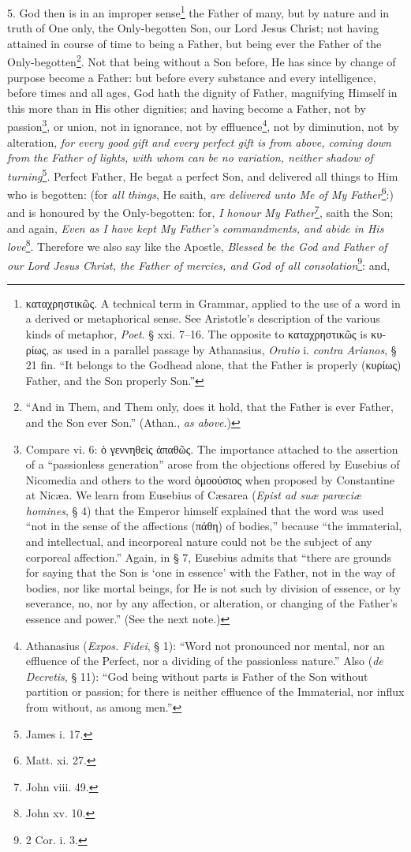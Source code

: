 5. God then is in an improper sense\footnote{\textgreek{καταχρηστικῶς}. A technical term in Grammar, applied to the use of a word in a derived or metaphorical sense. See Aristotle’s description of the various kinds of metaphor, \emph{Poet}. § xxi. 7–16. The opposite to \textgreek{καταχρηστικῶς} is \textgreek{κυρίως}, as used in a parallel passage by Athanasius, \emph{Oratio} i. \emph{contra Arianos}, § 21 fin. “It belongs to the Godhead alone, that the Father is properly (\textgreek{κυρίως}) Father, and the Son properly Son.”} the Father of many, but by nature and in truth of One only, the Only-begotten Son, our Lord Jesus Christ; not having attained in course of time to being a Father, but being ever the Father of the Only-begotten\footnote{“And in Them, and Them only, does it hold, that the Father is ever Father, and the Son ever Son.” (Athan., \emph{as above}.)}. Not that being without a Son before, He has since by change of purpose become a Father: but before every substance and every intelligence, before times and all ages, God hath the dignity of Father, magnifying Himself in this more than in His other dignities; and having become a Father, not by passion\footnote{Compare vi. 6: \textgreek{ὁ γεννηθεὶς ἀπαθῶς.} The importance attached to the assertion of a “passionless generation” arose from the objections offered by Eusebius of Nicomedia and others to the word \textgreek{ὁμοούσιος} when proposed by Constantine at Nicæa. We learn from Eusebius of Cæsarea (\emph{Epist ad suæ parœciæ homines}, § 4) that the Emperor himself explained that the word was used “not in the sense of the affections (\textgreek{πάθη}) of bodies,” because “the immaterial, and intellectual, and incorporeal nature could not be the subject of any corporeal affection.” Again, in § 7, Eusebius admits that “there are grounds for saying that the Son is ‘one in essence’ with the Father, not in the way of bodies, nor like mortal beings, for He is not such by division of essence, or by severance, no, nor by any affection, or alteration, or changing of the Father’s essence and power.” (See the next note.)}, or union, not in ignorance, not by effluence\footnote{Athanasius (\emph{Expos. Fidei}, § 1): “Word not pronounced nor mental, nor an effluence of the Perfect, nor a dividing of the passionless nature.” Also (\emph{de Decretis}, § 11): “God being without parts is Father of the Son without partition or passion; for there is neither effluence of the Immaterial, nor influx from without, as among men.”}, not by diminution, not by alteration, \emph{for every good gift and every perfect gift is from above, coming down from the Father of lights, with whom can be no variation, neither shadow of turning}\footnote{James i. 17.}. Perfect Father, He begat a perfect Son, and delivered all things to Him who is begotten: (for \emph{all things}, He saith, \emph{are delivered unto Me of My Father}\footnote{Matt. xi. 27.}:) and is honoured by the Only-begotten: for, \emph{I honour My Father}\footnote{John viii. 49.}, saith the Son; and again, \emph{Even as I have kept My Father’s commandments, and abide in His love}\footnote{John xv. 10.}. Therefore we also say like the Apostle, \emph{Blessed be the God and Father of our Lord Jesus Christ, the Father of mercies, and God of all consolation}\footnote{2 Cor. i. 3.}: and, 